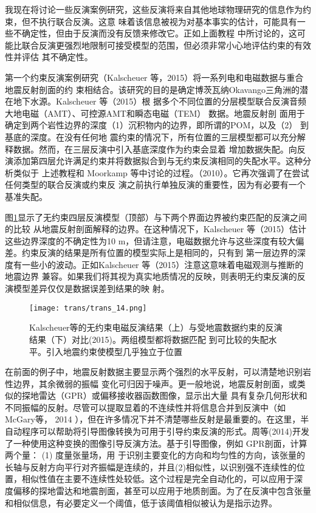 我现在将讨论一些反演案例研究，这些反演将来自其他地球物理研究的信息作为约束，但不执行联合反演。这意 味着该信息被视为对基本事实的估计，可能具有一些不确定性，但由于反演而没有反馈来修改它。正如上面教程 中所讨论的，这可能比联合反演更强烈地限制可接受模型的范围，但必须非常小心地评估约束的有效性并评估 其不确定性。

第一个约束反演案例研究（Kalscheuer 等，2015）将一系列电和电磁数据与重合地震反射剖面的约 束相结合。该研究的目的是确定博茨瓦纳Okavango三角洲的潜在地下水源。Kalscheuer 等（2015）根 据多个不同位置的分层模型联合反演音频大地电磁（AMT）、可控源AMT和瞬态电磁（TEM） 数据。地震反射剖 面用于确定到两个岩性边界的深度（1）沉积物内的边界，即所谓的POM，以及（2） 到基底的深度。在没有任何地 震约束的情况下，所有位置的三层模型都可以充分解释数据。然而，在三层反演中引入基底深度作为约束会显着 增加数据失配。向反演添加第四层允许满足约束并将数据拟合到与无约束反演相同的失配水平。这种分析类似于 上述教程和 Moorkamp 等中讨论的过程。（2010）。它再次强调了在尝试任何类型的联合反演或约束反 演之前执行单独反演的重要性，因为有必要有一个基准失配。

图\ref{trans14}显示了无约束四层反演模型（顶部）与下两个界面边界被约束匹配的反演之间的比较 从地震反射剖面解释的边界。在这种情况下，Kalscheuer 等（2015）估计这些边界深度的不确定性为10 m，但请注意，电磁数据允许与这些深度有较大偏差。约束反演的结果是所有位置的模型实际上是相同的，只有到 第一层边界的深度有一些小的波动。正如Kalscheuer 等（2015）注意这意味着电磁观测与推断的地震边界 兼容。如果我们将其视为真实地质情况的反映，则表明无约束反演的反演模型差异仅仅是数据误差到结果的映 射。

\begin{figure}[H]
    \centering
    \texttt{[image: trans/trans\_14.png]}
    \setcounter{figure}{6}
    \caption{Kalscheuer等的无约束电磁反演结果（上）与受地震数据约束的反演结果（下）对比(2015)。两组模型都将数据匹配 到可比较的失配水平。引入地震约束使模型几乎独立于位置}\label{trans14}
    
\end{figure}


在前面的例子中，地震反射数据主要显示两个强烈的水平反射，可以清楚地识别岩性边界，其余微弱的振幅 变化可归因于噪声。更一般地说，地震反射剖面，或类似的探地雷达（GPR）或偏移接收器函数图像，显示出大量 具有复杂几何形状和不同振幅的反射。尽管可以提取显着的不连续性并将信息合并到反演中（如McGary等， 2014 ），但在许多情况下并不清楚哪些反射是最重要的。在这里，半自动程序可以帮助将引导图像转换为可用于引导约束反演的形式。周等(2014)开发 了一种使用这种变换的图像引导反演方法。基于引导图像，例如 GPR剖面，计算两个量： (1) 度量张量场，用 于识别主要变化的方向和均匀性的方向，该张量的长轴与反射方向平行对齐振幅是连续的，并且(2)相似性，以识别强不连续性的位置，相似性值在主要不连续性处较低。这个过程是完全自动化的，可以应用于深 度偏移的探地雷达和地震剖面，甚至可以应用于地质剖面。为了在反演中包含张量和相似信息，有必要定义一个阈值，低于该阈值相似被认为是指示边界。

